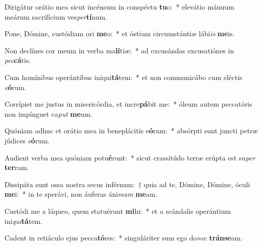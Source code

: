 \item Dirigátur orátio mea sicut incénsum in conspéctu \textbf{tu}o:~* elevátio mánuum meárum sacrifícium ves\textit{per}\textbf{tí}num.
\item Pone, Dómine, custódiam ori \textbf{me}o:~* et óstium circumstántiæ lábi\textit{is} \textbf{me}is.
\item Non declínes cor meum in verba ma\textbf{lí}tiæ:~* ad excusándas excusatiónes in \textit{pec}\textbf{cá}tis.
\item Cum homínibus operántibus iniqui\textbf{tá}tem:~* et non communicábo cum eléctis \textit{e}\textbf{ó}rum.
\item Corrípiet me justus in misericórdia, et incre\textbf{pá}bit me:~* óleum autem peccatóris non impínguet ca\textit{put} \textbf{me}um.
\item Quóniam adhuc et orátio mea in beneplácitis e\textbf{ó}rum:~* absórpti sunt juncti petræ júdices \textit{e}\textbf{ó}rum.
\item Audient verba mea quóniam potu\textbf{é}runt:~* sicut crassitúdo terræ erúpta est su\textit{per} \textbf{ter}ram.
\item Dissipáta sunt ossa nostra secus inférnum:~† quia ad te, Dómine, Dómine, óculi \textbf{me}i:~* in te sperávi, non áuferas áni\textit{mam} \textbf{me}am.
\item Custódi me a láqueo, quem statuérunt \textbf{mi}hi:~* et a scándalis operántium ini\textit{qui}\textbf{tá}tem.
\item Cadent in retiáculo ejus pecca\textbf{tó}res:~* singuláriter sum ego do\textit{nec} \textbf{tráns}\textbf{e}am.
